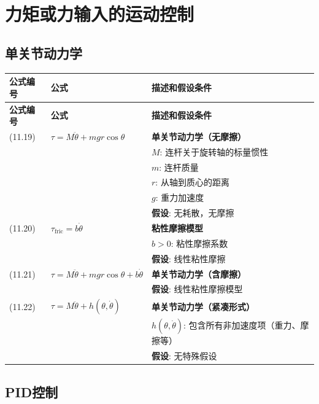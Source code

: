 \documentclass[12pt,a4paper]{article}
\begin{document}
\section{力矩或力输入的运动控制}

\subsection{单关节动力学}

\begin{longtable}{|p{}|p{}|p{}|}
\hline
\textbf{公式编号} & \textbf{公式} & \textbf{描述和假设条件} \\
\hline
\endfirsthead
\hline
\textbf{公式编号} & \textbf{公式} & \textbf{描述和假设条件} \\
\hline
\endhead
\hline
\endfoot
\hline
\endlastfoot

(11.19) & $\tau = M\ddot{\theta} + mgr\cos\theta$ & 
\textbf{单关节动力学（无摩擦）} \\
& & $M$: 连杆关于旋转轴的标量惯性 \\
& & $m$: 连杆质量 \\
& & $r$: 从轴到质心的距离 \\
& & $g$: 重力加速度 \\
& & \textbf{假设}: 无耗散，无摩擦 \\
\hline

(11.20) & $\tau_{\text{fric}} = b\dot{\theta}$ & 
\textbf{粘性摩擦模型} \\
& & $b > 0$: 粘性摩擦系数 \\
& & \textbf{假设}: 线性粘性摩擦 \\
\hline

(11.21) & $\tau = M\ddot{\theta} + mgr\cos\theta + b\dot{\theta}$ & 
\textbf{单关节动力学（含摩擦）} \\
& & \textbf{假设}: 线性粘性摩擦模型 \\
\hline

(11.22) & $\tau = M\ddot{\theta} + h(\theta, \dot{\theta})$ & 
\textbf{单关节动力学（紧凑形式）} \\
& & $h(\theta, \dot{\theta})$: 包含所有非加速度项（重力、摩擦等） \\
& & \textbf{假设}: 无特殊假设 \\
\hline

\end{longtable}

\subsection{PID控制}
\end{document}
